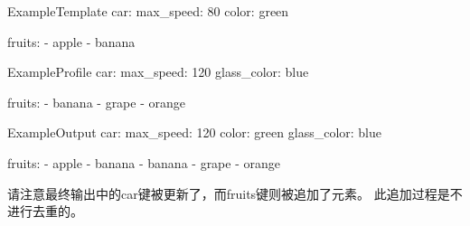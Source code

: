 \documentclass[a4paper,fontset=founder,punct=kaiming]{ctexart}
\renewcommand\_{\textunderscore\linebreak[1]}
\begin{document}
\noindent\medskip
\begin{SaveVerbatim}{ExampleTemplate}
car:
  max_speed: 80
  color: green

fruits:
- apple
- banana
\end{SaveVerbatim}
\begin{SaveVerbatim}{ExampleProfile}
car:
  max_speed: 120
  glass_color: blue

fruits:
- banana
- grape
- orange
\end{SaveVerbatim}
\begin{SaveVerbatim}{ExampleOutput}
car:
  max_speed: 120
  color: green
  glass_color: blue

fruits:
- apple
- banana
- banana
- grape
- orange
\end{SaveVerbatim}
\hspace{\fill}
\hspace{\fill}

\smallskip
请注意最终输出中的car键被更新了，而fruits键则被追加了元素。
此追加过程是不进行去重的。
\end{document}
